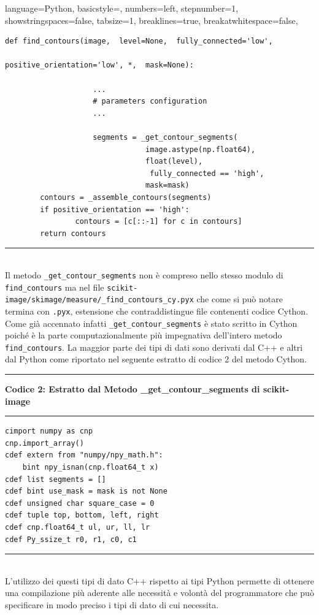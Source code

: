 \documentclass[12pt,a4paper]{report}
\begin{document}
\lstset
{ %
    language=Python,
    basicstyle=\footnotesize,
    numbers=left,
    stepnumber=1,
    showstringspaces=false,
    tabsize=1,
    breaklines=true,
    breakatwhitespace=false,
}
\begin{lstlisting}
def find_contours(image,  level=None,  fully_connected='low', 
																		positive_orientation='low', *,  mask=None):

					...
					# parameters configuration
					...	

					segments = _get_contour_segments(
					 			image.astype(np.float64), 
					 			float(level),
								 fully_connected == 'high', 
					 			mask=mask)
    	contours = _assemble_contours(segments)
    	if positive_orientation == 'high':
        		contours = [c[::-1] for c in contours]
    	return contours
\end{lstlisting}
\noindent\rule[0.5ex]{\linewidth}{1pt} \\[10pt]
Il metodo \verb|_get_contour_segments| non è compreso nello stesso modulo di  \verb|find_contours| ma nel file \verb|scikit-image/skimage/measure/_find_contours_cy.pyx| che come si può notare termina con \verb|.pyx|, estensione che contraddistingue file contenenti codice Cython.  Come già accennato infatti \verb|_get_contour_segments| è stato scritto in Cython poiché è la parte computazionalmente più impegnativa dell'intero metodo \verb|find_contours|.  \newline
La maggior parte dei tipi di dati sono derivati dal C++ e altri dal Python come riportato nel seguente estratto di codice 2 del metodo Cython.  \newpage
\noindent\rule[0.5ex]{\linewidth}{2pt}
\small{\textbf{Codice 2: Estratto dal Metodo \_get\_contour\_segments di scikit-image}} \\
\noindent\rule[0.5ex]{\linewidth}{1pt}
\begin{lstlisting}
cimport numpy as cnp
cnp.import_array()
cdef extern from "numpy/npy_math.h":
    bint npy_isnan(cnp.float64_t x)
cdef list segments = []
cdef bint use_mask = mask is not None
cdef unsigned char square_case = 0
cdef tuple top, bottom, left, right
cdef cnp.float64_t ul, ur, ll, lr
cdef Py_ssize_t r0, r1, c0, c1
\end{lstlisting}
\noindent\rule[0.5ex]{\linewidth}{1pt} \\[10pt]
L'utilizzo dei questi tipi di dato C++ rispetto ai tipi Python permette di ottenere una compilazione più aderente alle necessità e volontà del programmatore che può specificare in modo preciso i tipi di dato di cui necessita. \newline
\end{document}
